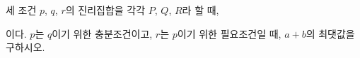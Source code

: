 세 조건 $p$, $q$, $r$의 진리집합을 각각 $P$, $Q$, $R$라 할 때, \par\smallskip{}\par\smallskip\noindent 이다. $p$는 $q$이기 위한 충분조건이고, $r$는 $p$이기 위한 필요조건일 때, $a+b$의 최댓값을 구하시오. 
